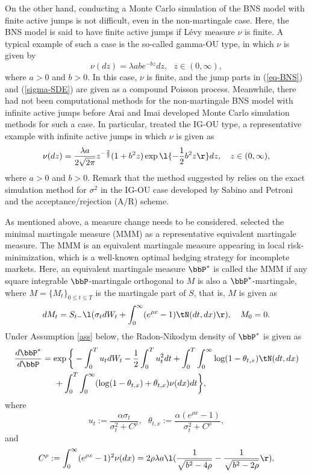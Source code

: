 On the other hand, conducting a Monte Carlo simulation of the BNS model with finite active jumps is not difficult, even in the non-martingale case.
Here, the BNS model is said to have finite active jumps if L\'evy measure $\nu$ is finite.
A typical example of such a case is the so-called gamma-OU type, in which $\nu$ is given by
\[
\nu(dz)=\lambda abe^{-bz}dz, \ \ \ z\in(0,\infty),
\]
where $a>0$ and $b>0$. In this case, $\nu$ is finite, and the jump parts in (\ref{eq-BNS}) and (\ref{sigma-SDE}) are given as a compound Poisson process.
Meanwhile, there had not been computational methods for the non-martingale BNS model with infinite active jumps before 
Arai and Imai \cite{AI} developed Monte Carlo simulation methods for such a case.
In particular, \cite{AI} treated the IG-OU type, a representative example with infinite active jumps in which $\nu$ is given as
\[
\nu(dz)=\frac{\lambda a}{2\sqrt{2\pi}}z^{-\frac{3}{2}}(1+b^2z)\exp\l\{-\frac{1}{2}b^2z\r\}dz, \ \ \ z\in(0,\infty),
\]
where $a>0$ and $b>0$.
Remark that the method suggested by \cite{AI} relies on the exact simulation method for $\sigma^2$
in the IG-OU case developed by Sabino and Petroni \cite{SP} and the acceptance/rejection (A/R) scheme.

As mentioned above, a measure change needs to be considered.
\cite{AI} selected the minimal martingale measure (MMM) as a representative equivalent martingale measure.
The MMM is an equivalent martingale measure appearing in local risk-minimization, which is a well-known optimal hedging strategy for incomplete markets.
Here, an equivalent martingale measure $\bbP^*$ is called the MMM if any square integrable $\bbP$-martingale orthogonal to $M$ is also a $\bbP^*$-martingale,
where $M=\{M_t\}_{0\leq t\leq T}$ is the martingale part of $S$, that is, $M$ is given as
\[
dM_t=S_{t-}\l(\sigma_t dW_t + \int_0^\infty(e^{\rho x}-1)\tN(dt,dx)\r), \ \ \ M_0=0.
\]
Under Assumption \ref{ass} below, the Radon-Nikodym density of $\bbP^*$ is given as
\begin{align*}
\frac{d\bbP^*}{d\bbP} &= \exp\bigg\{-\int_0^Tu_tdW_t-\frac{1}{2}\int_0^Tu_t^2dt+\int_0^T\int_0^\infty\log(1-\theta_{t,x})\tN(dt,dx) \\
                      &  \hspace{5mm}+\int_0^T\int_0^\infty(\log(1-\theta_{t,x})+\theta_{t,x})\nu(dx)dt\bigg\},
\end{align*}
where
\[
u_t:=\frac{\alpha\sigma_t}{\sigma_t^2+C^\rho}, \ \ \ \theta_{t,x}:=\frac{\alpha(e^{\rho x}-1)}{\sigma_t^2+C^\rho},
\]
and
\begin{equation}\label{eq-C2}
C^\rho:=\int_0^\infty(e^{\rho x}-1)^2\nu(dx)=2\rho\lambda a\l(\frac{1}{\sqrt{b^2-4\rho}}-\frac{1}{\sqrt{b^2-2\rho}}\r).
\end{equation}

